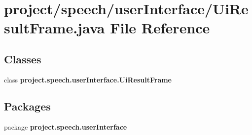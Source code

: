 \section{project/speech/user\+Interface/\+Ui\+Result\+Frame.java File Reference}
\label{_ui_result_frame_8java}
\subsection*{Classes}
\begin{DoxyCompactItemize}
\item 
class {\bf project.\+speech.\+user\+Interface.\+Ui\+Result\+Frame}
\end{DoxyCompactItemize}
\subsection*{Packages}
\begin{DoxyCompactItemize}
\item 
package {\bf project.\+speech.\+user\+Interface}
\end{DoxyCompactItemize}
